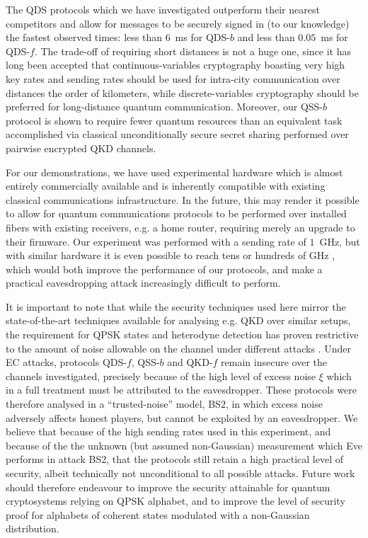 The QDS protocols which we have investigated outperform their nearest competitors and allow for messages to be securely signed in (to our knowledge) the fastest observed times: less than $6$~ms for QDS-$b$ and less than $0.05$~ms for QDS-$f$. The trade-off of requiring short distances is not a huge one, since it has long been accepted \cite{Pirandola2015a} that continuous-variables cryptography boasting very high key rates and sending rates should be used for intra-city communication over distances the order of kilometers, while discrete-variables cryptography should be preferred for long-distance quantum communication. Moreover, our QSS-$b$ protocol is shown to require fewer quantum resources than an equivalent task accomplished via classical unconditionally secure secret sharing performed over pairwise encrypted QKD channels.

For our demonstrations, we have used experimental hardware which is almost entirely commercially available and is inherently compatible with existing classical communications infrastructure. In the future, this may render it possible to allow for quantum communications protocols to be performed over installed fibers with existing receivers, e.g. a home router, requiring merely an upgrade to their firmware. Our experiment was performed with a sending rate of $1$~GHz, but with similar hardware it is even possible to reach tens or hundreds of GHz \cite{Khan2015, Khan2016}, which would both improve the performance of our protocols, and make a practical eavesdropping attack increasingly difficult to perform. 

It is important to note that while the security techniques used here mirror the state-of-the-art techniques available for analysing e.g. QKD \cite{Papanastasiou2018} over similar setups, the requirement for QPSK states and heterodyne detection has proven restrictive to the amount of noise allowable on the channel under different attacks \cite{Zhao2009, Bradler2018}. Under EC attacks, protocols QDS-$f$, QSS-$b$ and QKD-$f$ remain insecure over the channels investigated, precisely because of the high level of excess noise $\xi$ which in a full treatment must be attributed to the eavesdropper. These protocols were therefore analysed in a ``trusted-noise'' model, BS$2$, in which excess noise adversely affects honest players, but cannot be exploited by an eavesdropper. We believe that because of the high sending rates used in this experiment, and because of the the unknown (but assumed non-Gaussian) measurement which Eve performs in attack BS$2$, that the protocols still retain a high practical level of security, albeit technically not unconditional to all possible attacks. Future work should therefore endeavour to improve the security attainable for quantum cryptosystems relying on QPSK alphabet, and to improve the level of security proof for alphabets of coherent states modulated with a non-Gaussian distribution.


